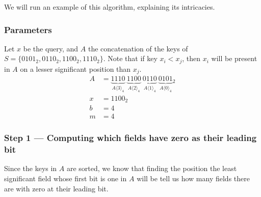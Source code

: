 We will run an example of this algorithm, explaining its intricacies.

\subsubsection{Parameters}

Let $x$ be the query, and $A$ the concatenation of the keys of $S = \{0101_2, 0110_2, 1100_2, 1110_2 \}$. Note that if key $x_i < x_j$, then $x_i$ will be present in $A$ on a lesser significant position than $x_j$.
\begin{align*}
    A &= \underbrace{1110}_{A\langle 3 \rangle_4}\ \underbrace{1100}_{A\langle 2 \rangle_4}\ \underbrace{0110}_{A\langle 1\rangle_4}\ \underbrace{0101}_{A\langle 0 \rangle_4}{}_2 \\
    x &= 1100_2 \\
    b &= 4 \\
    m &= 4
\end{align*}

\subsubsection{Step 1 --- Computing which fields have zero as their leading bit}

Since the keys in $A$ are sorted, we know that finding the position the least significant field whose first bit is one in $A$ will be tell us how many fields there are with zero at their leading bit.


